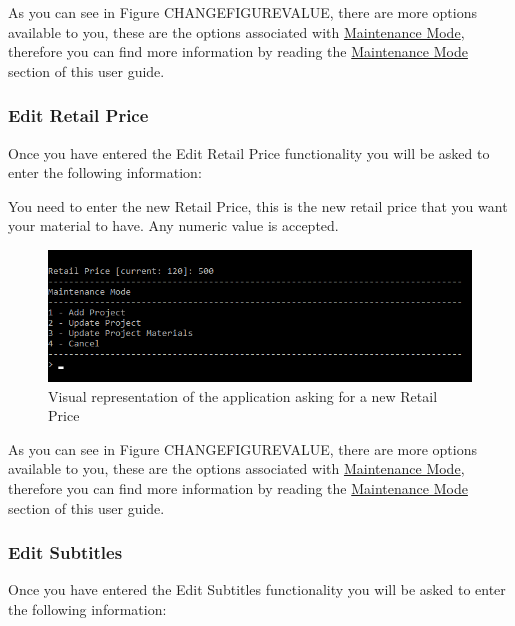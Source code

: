 \documentclass[
  english,
  a4paper,
,tablecaptionabove
]{scrartcl}
\begin{document}
As you can see in Figure CHANGEFIGUREVALUE, there are more options
available to you, these are the options associated with
\protect\hyperlink{using-maintenance-mode}{Maintenance Mode}, therefore
you can find more information by reading the
\protect\hyperlink{using-maintenance-mode}{Maintenance Mode} section of
this user guide.

\newpage

\hypertarget{edit-retail-price-1}{%
\subsubsection{Edit Retail Price}\label{edit-retail-price-1}}

Once you have entered the Edit Retail Price functionality you will be
asked to enter the following information:

You need to enter the new Retail Price, this is the new retail price
that you want your material to have. Any numeric value is accepted.

\begin{figure}
\centering
\includegraphics{images/user-guide/maintenance-mode/update-project-material-retail-price.png}
\caption{Visual representation of the application asking for a new
Retail Price}
\end{figure}

As you can see in Figure CHANGEFIGUREVALUE, there are more options
available to you, these are the options associated with
\protect\hyperlink{using-maintenance-mode}{Maintenance Mode}, therefore
you can find more information by reading the
\protect\hyperlink{using-maintenance-mode}{Maintenance Mode} section of
this user guide.

\newpage

\hypertarget{edit-subtitles-1}{%
\subsubsection{Edit Subtitles}\label{edit-subtitles-1}}

Once you have entered the Edit Subtitles functionality you will be asked
to enter the following information:
\end{document}
